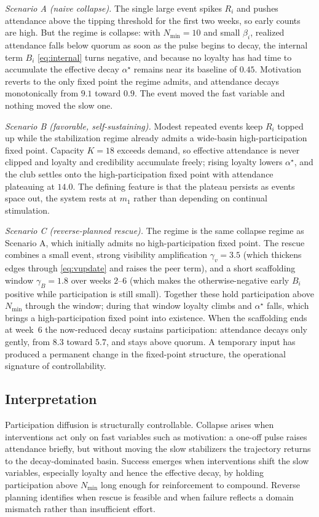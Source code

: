 \documentclass[11pt]{article}
\begin{document}
\emph{Scenario A (naive collapse).} The single large event spikes $R_i$ and pushes attendance above the tipping threshold for the first two weeks, so early counts are high. But the regime is collapse: with $N_{\min}=10$ and small $\beta_i$, realized attendance falls below quorum as soon as the pulse begins to decay, the internal term $B_i$ \eqref{eq:internal} turns negative, and because no loyalty has had time to accumulate the effective decay $\alpha^\star$ remains near its baseline of $0.45$. Motivation reverts to the only fixed point the regime admits, and attendance decays monotonically from $9.1$ toward $0.9$. The event moved the fast variable and nothing moved the slow one.

\emph{Scenario B (favorable, self-sustaining).} Modest repeated events keep $R_i$ topped up while the stabilization regime already admits a wide-basin high-participation fixed point. Capacity $K=18$ exceeds demand, so effective attendance is never clipped and loyalty and credibility accumulate freely; rising loyalty lowers $\alpha^\star$, and the club settles onto the high-participation fixed point with attendance plateauing at $14.0$. The defining feature is that the plateau persists as events space out, the system rests at $m_1$ rather than depending on continual stimulation.

\emph{Scenario C (reverse-planned rescue).} The regime is the same collapse regime as Scenario A, which initially admits no high-participation fixed point. The rescue combines a small event, strong visibility amplification $\gamma_v=3.5$ (which thickens edges through \eqref{eq:vupdate} and raises the peer term), and a short scaffolding window $\gamma_B=1.8$ over weeks $2$--$6$ (which makes the otherwise-negative early $B_i$ positive while participation is still small). Together these hold participation above $N_{\min}$ through the window; during that window loyalty climbs and $\alpha^\star$ falls, which brings a high-participation fixed point into existence. When the scaffolding ends at week~$6$ the now-reduced decay sustains participation: attendance decays only gently, from $8.3$ toward $5.7$, and stays above quorum. A temporary input has produced a permanent change in the fixed-point structure, the operational signature of controllability.

\subsection{Interpretation}
Participation diffusion is structurally controllable. Collapse arises when interventions act only on fast variables such as motivation: a one-off pulse raises attendance briefly, but without moving the slow stabilizers the trajectory returns to the decay-dominated basin. Success emerges when interventions shift the slow variables, especially loyalty and hence the effective decay, by holding participation above $N_{\min}$ long enough for reinforcement to compound. Reverse planning identifies when rescue is feasible and when failure reflects a domain mismatch rather than insufficient effort.
\end{document}
